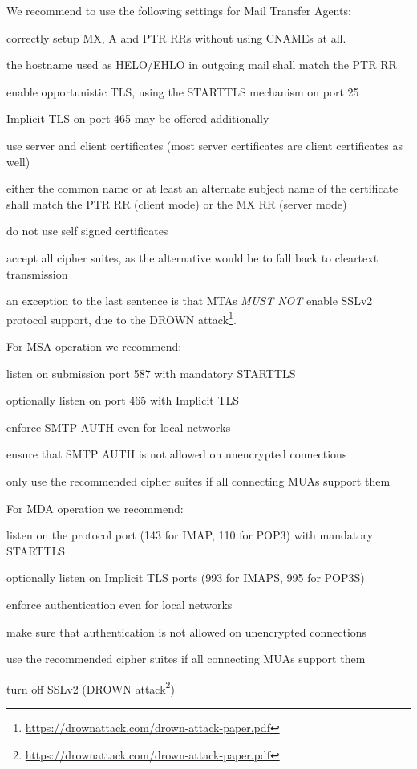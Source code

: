We recommend to use the following settings for Mail Transfer Agents:
\begin{itemize*}
  \item correctly setup MX, A and PTR RRs without using CNAMEs at all.
  \item the hostname used as HELO/EHLO in outgoing mail shall match the PTR RR
  \item enable opportunistic TLS, using the STARTTLS mechanism on port 25
  \item Implicit TLS on port 465 may be offered additionally
  \item use server and client certificates (most server certificates are client
    certificates as well)
  \item either the common name or at least an alternate subject name of the
    certificate shall match the PTR RR (client mode) or the MX RR (server mode)
  \item do not use self signed certificates
  \item accept all cipher suites, as the alternative would be to fall back to
    cleartext transmission
  \item an exception to the last sentence is that MTAs \textit{MUST NOT}
    enable SSLv2 protocol support, due to the DROWN attack\footnote{\url{https://drownattack.com/drown-attack-paper.pdf}}.
\end{itemize*}

For MSA operation we recommend:
\begin{itemize*}
  \item listen on submission port 587 with mandatory STARTTLS
  \item optionally listen on port 465 with Implicit TLS
  \item enforce SMTP AUTH even for local networks
  \item ensure that SMTP AUTH is not allowed on unencrypted connections
  \item only use the recommended cipher suites if all connecting MUAs support them
\end{itemize*}

For MDA operation we recommend:
\begin{itemize*}
  \item listen on the protocol port (143 for IMAP, 110 for POP3) with mandatory
    STARTTLS
  \item optionally listen on Implicit TLS ports (993 for IMAPS, 995 for POP3S)
  \item enforce authentication even for local networks
  \item make sure that authentication is not allowed on unencrypted connections
  \item use the recommended cipher suites if all connecting MUAs support them
  \item turn off SSLv2 (DROWN attack\footnote{\url{https://drownattack.com/drown-attack-paper.pdf}})
\end{itemize*}

